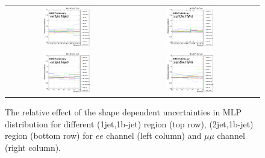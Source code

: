 \begin{figure}[ht]
  \begin{center}
    \begin{tabular}{ccc}
      \includegraphics[width=0.4\textwidth]{figures/tW/fig/Step2/uncertainties/ee/Shape_uncert_H_MLP_1jet_1bjet_comb.png} &
      \includegraphics[width=0.4\textwidth]{figures/tW/fig/Step2/uncertainties/mumu/Shape_uncert_H_MLP_1jet_1bjet_comb.png}\\
      \includegraphics[width=0.4\textwidth]{figures/tW/fig/Step2/uncertainties/ee/Shape_uncert_H_MLP_2jet_1bjet_comb.png} &
      \includegraphics[width=0.4\textwidth]{figures/tW/fig/Step2/uncertainties/mumu/Shape_uncert_H_MLP_2jet_1bjet_comb.png}\\
    \end{tabular}
    \caption{The relative effect of the shape dependent uncertainties in MLP distribution for different (1jet,1b-jet)  region (top row), (2jet,1b-jet) region (bottom row) for $ee$ channel (left column) and $\mu\mu$ channel (right column).
    \label{fig:uncert_shape}}
  \end{center}
\end{figure}


%






